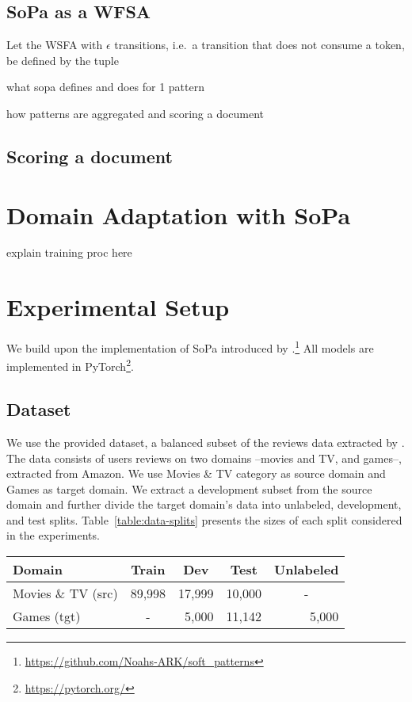 \documentclass[11pt,a4paper]{article}
\begin{document}
\subsection{SoPa as a WFSA}

Let the WSFA with $\epsilon$ transitions, i.e.\ a transition that does not consume a token, be defined by the tuple 

what sopa defines and does for 1 pattern


how patterns are aggregated and scoring a document


\subsection{Scoring a document}



\section{Domain Adaptation with SoPa}

explain training proc here


\section{Experimental Setup}

We build upon the implementation of SoPa introduced by \citet{schwartz2018sopa}.\footnote{\url{https://github.com/Noahs-ARK/soft_patterns}} All models are implemented in PyTorch\footnote{\url{https://pytorch.org/}}.

\subsection{Dataset}

We use the provided dataset, a balanced subset of the reviews data extracted by \citet{mcauley2015image}. The data consists of users reviews on two domains --movies and TV, and games--, extracted from Amazon.
We use Movies \& TV category as source domain and Games as target domain. We extract a development subset from the source domain and further divide the target domain's data into unlabeled, development, and test splits. Table~\ref{table:data-splits} presents the sizes of each split considered in the experiments.

\begin{table*}[]
\centering
\begin{tabular}{|l|c|r|r|c|}
\hline
Domain              & Train                       & \multicolumn{1}{c|}{Dev} & \multicolumn{1}{c|}{Test} & Unlabeled                  \\ \hline
Movies \& TV (src) & \multicolumn{1}{r|}{89,998} & 17,999                   & 10,000                    & -                          \\ \hline
Games (tgt)         & -                           & 5,000                    & 11,142                    & \multicolumn{1}{r|}{5,000} \\ \hline
\end{tabular}
\caption{Size of data splits in source (src) and target (tgt) domains.}
\label{table:data-splits}
\end{table*}
\end{document}
